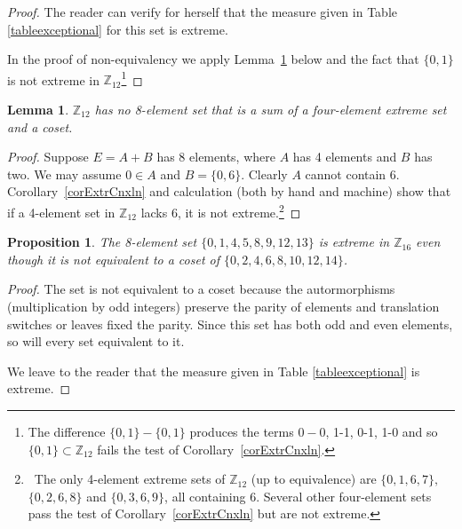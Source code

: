 \documentclass[letter,11pt]{amsart}
\numberwithin{theorem}{section}
\newtheorem{lem}[theorem]{Lemma}
\newtheorem{prop}[theorem]{Proposition}
\theoremstyle{remark}
\numberwithin{equation}{section}
\newcommand{\corref}[1]{Corollary~\ref{#1}}
\newcommand{\lemref}[1]{Lemma~\ref{#1}}
\newcommand\Zp[2]{\texttt{$\mathbb Z_{#1}^{\	#2}$}}
\begin{document}
\begin{proof}
The reader can verify for herself that the measure given in Table \ref{tableexceptional} for this set is extreme.

In the proof of non-equivalency we apply \lemref{lemsumsinZtwlv} below and the fact that $\{0,1\}$ is not extreme in \Zp{12}{}\footnote{The difference 
$\{0,1\}-\{0,1\}$ produces the terms $0-0$, 1-1, 0-1, 1-0 and so $\{0,1\} \subset \Zp{12}{} $ fails the test of \corref{corExtrCnxln}.} 
\end{proof}


\begin{lem}\label{lemsumsinZtwlv}
\Zp{12}{} has no 8-element set that is a sum of a four-element extreme set and a coset.
\end{lem}

\begin{proof}
Suppose $E= A+B$ has 8 elements, where $A$ has 4 elements and $B$ has two. We may assume $0\in A$ and $B=\{0,6\}$.
Clearly $A$ cannot contain 6. \corref{corExtrCnxln} and calculation (both by hand and machine) show that if a 4-element set in \Zp{12}{} 
 lacks 6, it is not 
extreme.\footnote{\,
The only 4-element extreme sets of \Zp{12}{} (up to equivalence) 
are $\{0,1,6,7\},$ $\{0, 2,6,8\}$ and $\{0,3,6,9\}$, all containing 6. Several other four-element sets pass the test of
\corref{corExtrCnxln} but are not extreme.}%
\end{proof}



\begin{prop}\label{prop8in16} The 8-element set
$\{0, 1, 4, 5, 8, 9, 12, 13\}$ 
is  extreme in \Zp{16}{} even though it is not equivalent to a coset of $\{0,2,4,6, 8,10,12,14\}$.
\end{prop}


\begin{proof}
The set is   not equivalent to a coset because the autormorphisms 
(multiplication by odd integers) preserve the parity  of
 elements and translation switches or leaves fixed the 
 parity. Since this set has both odd and even elements, 
 so will every set equivalent to it. 
 
 We leave to the reader that the measure given in Table \ref{tableexceptional} is extreme.
\end{proof}
\end{document}
